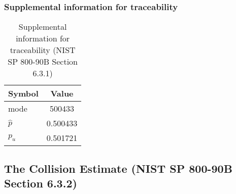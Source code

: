 \documentclass[a3paper,xelatex,english]{bxjsarticle}
\begin{document}
\subsubsection{Supplemental information for traceability}
\renewcommand{\arraystretch}{1.8}
\begin{table}[h]
\caption{Supplemental information for traceability (NIST SP 800-90B Section 6.3.1)}
\begin{center}
\begin{tabular}{|l|c|}
\hline 
\rowcolor{anotherlightblue} %
Symbol				& Value \\ \hline 
mode				&   500433\\ \hline 
$\hat{p}$ 			& 0.500433\\ \hline
$p_u$				& 0.501721\\ \hline
\end{tabular}
\end{center}
\end{table}
\renewcommand{\arraystretch}{1.4}
\clearpage
\subsection{The Collision Estimate (NIST SP 800-90B Section 6.3.2)}\label{sec:Binary632}
\end{document}
